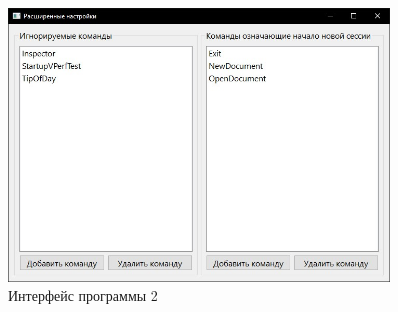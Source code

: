 \begin{figure}[h!]
\centering
\includegraphics[width=0.9\textwidth]{inc/img/interface2.jpg}
\caption{Интерфейс программы 2}
\label{interface2}
\end{figure}

%

%
